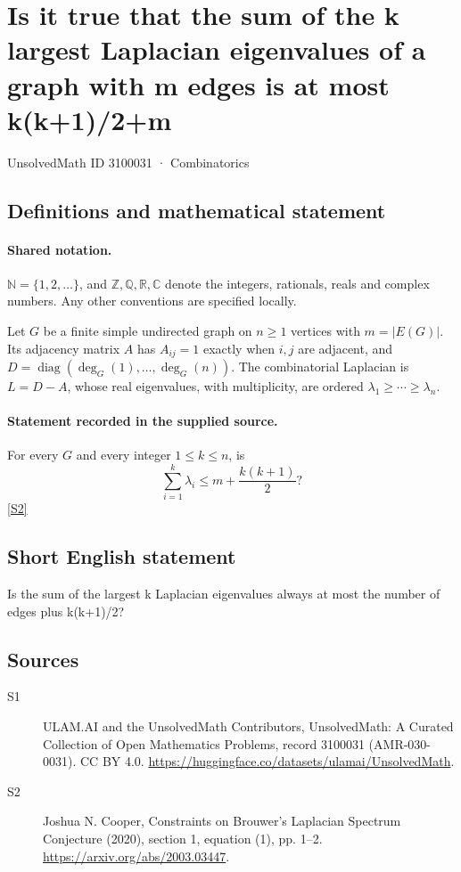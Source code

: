 \documentclass[11pt]{article}
\newcommand{\sref}[2]{\hyperlink{source:#1:#2}{[S#2]}}
\begin{document}
\setcounter{section}{3100030}
\section{Is it true that the sum of the k largest Laplacian eigenvalues of a graph with m edges is at most k(k+1)/2+m}\label{3100031}
{\small\sffamily UnsolvedMath ID 3100031 · Combinatorics}
\subsection{Definitions and mathematical statement}

\paragraph{Shared notation.}$\mathbb N=\{1,2,\ldots\}$, and $\mathbb Z,\mathbb Q,\mathbb R,\mathbb C$ denote the integers, rationals, reals and complex numbers. Any other conventions are specified locally.


Let $G$ be a finite simple undirected graph on $n\geq1$ vertices with $m=|E(G)|$. Its adjacency matrix $A$ has $A_{ij}=1$ exactly when $i,j$ are adjacent, and $D=\operatorname{diag}(\deg_G(1),\ldots,\deg_G(n))$. The combinatorial Laplacian is $L=D-A$, whose real eigenvalues, with multiplicity, are ordered $\lambda_1\geq\cdots\geq\lambda_n$.
\paragraph{Statement recorded in the supplied source.}
For every $G$ and every integer $1\leq k\leq n$, is
\[\sum_{i=1}^k\lambda_i\leq m+\frac{k(k+1)}2?\] \sref{3100031}{2}
\subsection{Short English statement}
Is the sum of the largest k Laplacian eigenvalues always at most the number of edges plus k(k+1)/2?
\subsection{Sources}
\begin{description}
\item[\hypertarget{source:3100031:1}{S1}] ULAM.AI and the UnsolvedMath Contributors, UnsolvedMath: A Curated Collection of Open Mathematics Problems, record 3100031 (AMR-030-0031). CC BY 4.0. \url{https://huggingface.co/datasets/ulamai/UnsolvedMath}.
\item[\hypertarget{source:3100031:2}{S2}] Joshua N. Cooper, Constraints on Brouwer's Laplacian Spectrum Conjecture (2020), section 1, equation (1), pp. 1--2. \url{https://arxiv.org/abs/2003.03447}.
\end{description}
\label{end:3100031}
\end{document}

